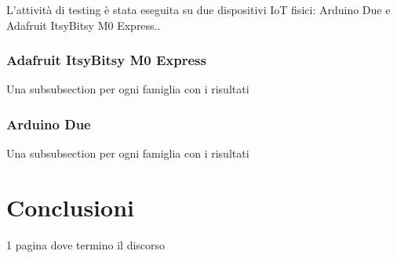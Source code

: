 \documentclass{report}
\begin{document}
L'attività di testing è stata eseguita su due dispositivi IoT fisici: Arduino Due e Adafruit ItsyBitsy M0 Express..

\subsection{Adafruit ItsyBitsy M0 Express}

Una subsubsection per ogni famiglia con i risultati

\subsection{Arduino Due}

Una subsubsection per ogni famiglia con i risultati

\newpage

\chapter{Conclusioni}

1 pagina dove termino il discorso

\newpage
\end{document}
